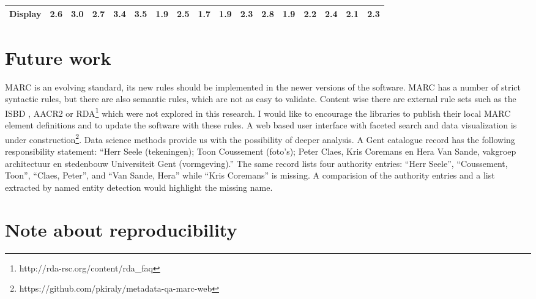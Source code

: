 {\begin{landscape}
\begin{table*}
\begin{minipage}{\columnwidth}
\begin{center}
\begin{tabular}{lrrrrrrrrrrrrrrrr}
Display & 2.6 & 3.0 & 2.7 & 3.4 & 3.5 & 1.9 & 2.5 & 1.7 & 1.9 & 2.3 & 2.8 & 1.9 & 2.2 & 2.4 & 2.1 & 2.3 \\
\bottomrule
\end{tabular}
\end{center}
\end{minipage}
\end{table*}
    \end{landscape}
    \clearpage%
}



\section{Future work}

MARC is an evolving standard, its new rules should be implemented in the newer versions of the software. MARC has a number of strict syntactic rules, but there are also semantic rules, which are not as easy to validate. Content wise there are external rule sets such as the ISBD \cite{isbd}, AACR2 \cite{aacr2} or RDA\footnote{http://rda-rsc.org/content/rda\_faq} which were not explored in this research. I would like to encourage the libraries to publish their local MARC element definitions and to update the software with these rules. A web based user interface with faceted search and data visualization is under construction\footnote{https://github.com/pkiraly/metadata-qa-marc-web}. Data science methods provide us with the possibility of deeper analysis. A Gent catalogue record has the following responsibility statement: ``Herr Seele (tekeningen); Toon Coussement (foto's); Peter Claes, Kris Coremans en Hera Van Sande, vakgroep architectuur en stedenbouw Universiteit Gent (vormgeving).'' The same record lists four authority entries: ``Herr Seele'', ``Coussement, Toon'', ``Claes, Peter'', and ``Van Sande, Hera'' while ``Kris Coremans'' is missing. A comparision of the authority entries and a list extracted by named entity detection would highlight the missing name.

\section{Note about reproducibility}


